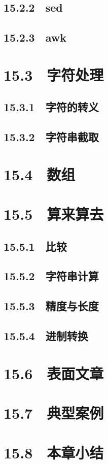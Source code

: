 \documentclass[12pt,UTF8]{ctexbook}
\begin{document}
{\subsection{15.2.2　sed}
\subsection{15.2.3　awk}
\section{15.3　字符处理}
\subsection{15.3.1　字符的转义}
\subsection{15.3.2　字符串截取}
\section{15.4　数组}
\section{15.5　算来算去}
\subsection{15.5.1　比较}
\subsection{15.5.2　字符串计算}
\subsection{15.5.3　精度与长度}
\subsection{15.5.4　进制转换}
\section{15.6　表面文章}
\section{15.7　典型案例}
\section{15.8　本章小结}
}
\end{document}
